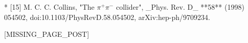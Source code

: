 * [15] M. C. C. Collins, "The \(\pi^{+}\pi^{-}\) collider", _Phys. Rev. D_ **58** (1998) 054502, doi:10.1103/PhysRevD.58.054502, arXiv:hep-ph/9709234.

[MISSING_PAGE_POST]

 
